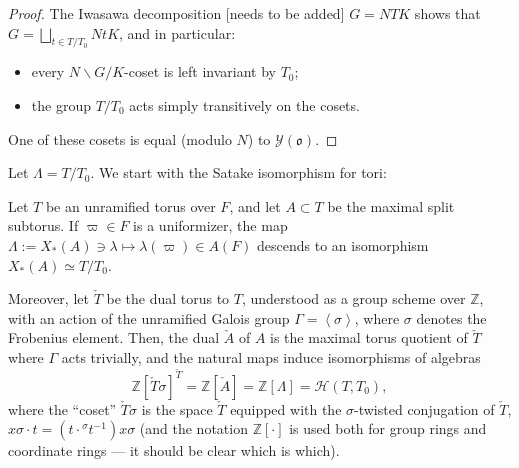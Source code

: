 \begin{proof}
 The Iwasawa decomposition [needs to be added] $G = N T K$ shows that $G = \bigsqcup_{t\in T/T_0} N t K$, and in particular: 
 \begin{itemize}
  \item every $N\backslash G/K$-coset is left invariant by $T_0$;
  \item the group $T/T_0$ acts simply transitively on the cosets.
\end{itemize}
One of these cosets is equal (modulo $N$) to $\mathcal Y(\mathfrak o)$.
\end{proof}

Let $\Lambda = T/T_0$.  We start with the Satake isomorphism for tori:

\begin{proposition}
 \label{proposition-Satake-torus}
Let $T$ be an unramified torus over $F$, and let $A\subset T$ be the maximal split subtorus. If $\varpi \in F$ is a uniformizer, the map $\Lambda:=X_*(A)\ni \lambda\mapsto \lambda(\varpi) \in A(F)$ descends to an isomorphism $X_*(A)\simeq T/T_0$. 

Moreover, let $\check T$ be the dual torus to $T$, understood as a group scheme over $\mathbb Z$, with an action of the unramified Galois group $\Gamma = \left< \sigma \right>$, where $\sigma$ denotes the Frobenius element. Then, the dual $\check A$ of $A$ is the maximal torus quotient of $\check T$ where $\Gamma$ acts trivially, and the natural maps induce isomorphisms of algebras
\begin{equation}
 \label{equation-Satake-torus}
 \mathbb Z[\check T \sigma]^{\check T} = \mathbb Z[\check A] = \mathbb Z[\Lambda] = \mathcal H(T,T_0),
\end{equation}
where the ``coset'' $\check T \sigma$ is the space $\check T$ equipped with the $\sigma$-twisted conjugation of $\check T$, $x\sigma \cdot t = (t\cdot {^\sigma t^{-1}}) x \sigma$
(and the notation $\mathbb Z[\cdot]$ is used both for group rings and coordinate rings --- it should be clear which is which).
\end{proposition}

